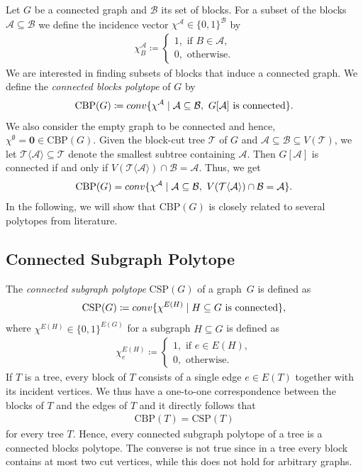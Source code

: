 \documentclass[12pt]{amsart}
\newcommand{\conv}{\mathop{\rm conv}\nolimits}
\newcommand{\CBP}{\mathrm{CBP}}
\newcommand{\CSP}{\mathrm{CSP}}
\newcommand{\T}{\mathcal{T}}
\newcommand{\B}{\mathcal{B}}
\newcommand{\A}{\mathcal{A}}
\begin{document}
Let $G$ be a connected graph and $\B$ its set of blocks. For a subset of the blocks $\A \subseteq \B$ we define the incidence vector $\chi^\A \in \{0,1\}^{\B}$ by
\begin{align*}
    \chi_B^\A\coloneqq \begin{cases} 1, \text{ if } B \in \A, \\
                            0, \text{ otherwise}.\end{cases}
\end{align*}
We are interested in finding subsets of blocks that induce a connected graph. We define the \textit{connected blocks polytope} of $G$ by
\begin{align*}
    \CBP(G) \coloneqq \conv\{\chi^\A \mid \A \subseteq \B, \ G[\A] \text{ is connected} \}.
\end{align*}
We also consider the empty graph to be connected and hence, $\chi^\emptyset=\mathbf{0} \in \CBP(G)$. Given the block-cut tree $\T$ of $G$ and $\A \subseteq \B \subseteq V(\T)$, we let $\T\langle\A\rangle \subseteq \T$ denote the smallest subtree containing $\A$. Then $G[\A]$ is connected if and only if $V(\T\langle\A\rangle) \cap \B=\A$. Thus, we get
\begin{align*}
    \CBP(G) = \conv\{\chi^\A \mid \A \subseteq \B, \ V(\T\langle\A\rangle) \cap \B=\A \}.
\end{align*}
In the following, we will show that $\CBP(G)$ is closely related to several polytopes from literature.

\subsection{Connected Subgraph Polytope}

The \textit{connected subgraph polytope} $\CSP(G)$ of a graph~$G$ is defined as
\begin{align*}
    \CSP(G) \coloneqq \conv\{\chi^{E(H)} \mid H \subseteq G \text{ is connected} \},
\end{align*}
where $\chi^{E(H)} \in \{0,1\}^{E(G)}$ for a subgraph $H \subseteq G$ is defined as
\begin{align*}
         \chi^{E(H)}_e\coloneqq \begin{cases} 1, \text{ if } e \in E(H), \\
                               0, \text{ otherwise}.\end{cases}
\end{align*}
If $T$ is a tree, every block of $T$ consists of a single edge $e \in E(T)$ together with its incident vertices. We thus have a one-to-one correspondence between the blocks of $T$ and the edges of $T$ and it directly follows that
\begin{align*}
    \CBP(T)=\CSP(T)
\end{align*}
for every tree $T$. Hence, every connected subgraph polytope of a tree is a connected blocks polytope. The converse is not true since in a tree every block contains at most two cut vertices, while this does not hold for arbitrary graphs.
\end{document}
